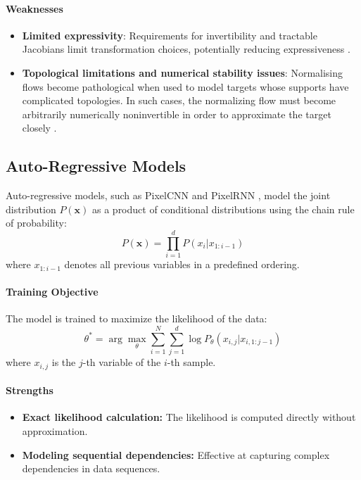 \paragraph{Weaknesses}

\begin{itemize}
    \item \textbf{Limited expressivity}: Requirements for invertibility and tractable Jacobians limit transformation choices, potentially reducing expressiveness \cite{papamakarios2019normalizing}.
    \item \textbf{Topological limitations and numerical stability issues}: Normalising flows become pathological when used to model targets whose supports have complicated topologies. In such cases, the normalizing flow must become arbitrarily numerically noninvertible in order to approximate the target closely \cite{behrmann2021understanding, cornish2020relaxing}.
\end{itemize}



\subsection{Auto-Regressive Models}
Auto-regressive models, such as PixelCNN and PixelRNN \cite{intro:oord2016pixel}, model the joint distribution \( P(\mathbf{x}) \) as a product of conditional distributions using the chain rule of probability:
\[
P(\mathbf{x}) = \prod_{i=1}^{d} P(x_i | x_{1:i-1})
\]
where \( x_{1:i-1} \) denotes all previous variables in a predefined ordering.

\paragraph{Training Objective}
The model is trained to maximize the likelihood of the data:
\[
\theta^* = \arg \max_{\theta} \sum_{i=1}^{N} \sum_{j=1}^{d} \log P_{\theta}(x_{i,j} | x_{i,1:j-1})
\]
where \( x_{i,j} \) is the \( j \)-th variable of the \( i \)-th sample.

\paragraph{Strengths}
\begin{itemize}
    \item \textbf{Exact likelihood calculation:} The likelihood is computed directly without approximation.
    \item \textbf{Modeling sequential dependencies:} Effective at capturing complex dependencies in data sequences.
\end{itemize}

